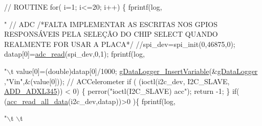 \begin{DoxyCode}
\textcolor{comment}{// ROUTINE }
  \textcolor{keywordflow}{for}( i=1; i<=20; i++)
  \{  
      fprintf(log,\textcolor{stringliteral}{"    %
  \textcolor{comment}{// ADC}
\textcolor{comment}{/*FALTA IMPLEMENTAR AS ESCRITAS NOS GPIOS RESPONSÁVEIS PELA SELEÇÃO DO CHIP
       SELECT QUANDO REALMENTE FOR USAR A PLACA*/}
      \textcolor{comment}{//spi\_dev=spi\_init(0,46875,0);}
      datap[0]=\hyperlink{spi__functions_01_07C_xC3_xB3pia_01em_01conflito_01de_01Andr_xC3_xA9_01Carvalho_012013-04-26_08_8c_ae385345c227d9f67ab490b94ed628988}{adc\_read}(spi\_dev,0,1);
      fprintf(log,\textcolor{stringliteral}{"\(\backslash\)t%
      value[0]=(double)datap[0]/1000;
      \hyperlink{gdatalogger_8c_a32674e7c2afa8b78e99a0070cf4bcaf9}{gDataLogger\_InsertVariable}(&\hyperlink{datalogger_01_07Caio-PC's_01conflicted_01copy_012012-11-23_08_8c_abe3b9c2c4e21e79c7b046b5986d13acc}{gDataLogger}
      ,\textcolor{stringliteral}{"Vin"},&(value[0]));
  \textcolor{comment}{// ACCelerometer}
      \textcolor{keywordflow}{if} ( (ioctl(i2c\_dev, I2C\_SLAVE, \hyperlink{imu__functions_01_07C_xC3_xB3pia_01em_01conflito_01de_01Andr_xC3_xA9_01Carvalho_012013-04-26_08_8h_a909f4a5773e20e672cdb4088e1cfa22f}{ADD\_ADXL345})) < 0) \{
        perror(\textcolor{stringliteral}{"ioctl(I2C\_SLAVE) acc"});
        \textcolor{keywordflow}{return} -1;
      \}  
      \textcolor{keywordflow}{if}( (\hyperlink{group__acc_ga013bb5ed8a763883fc440549d2b1a6ce}{acc\_read\_all\_data}(i2c\_dev,datap))>0 )\{
        fprintf(log,\textcolor{stringliteral}{"\(\backslash\)t%
      \(\backslash\)t%
        
}}}
\end{DoxyCode}
